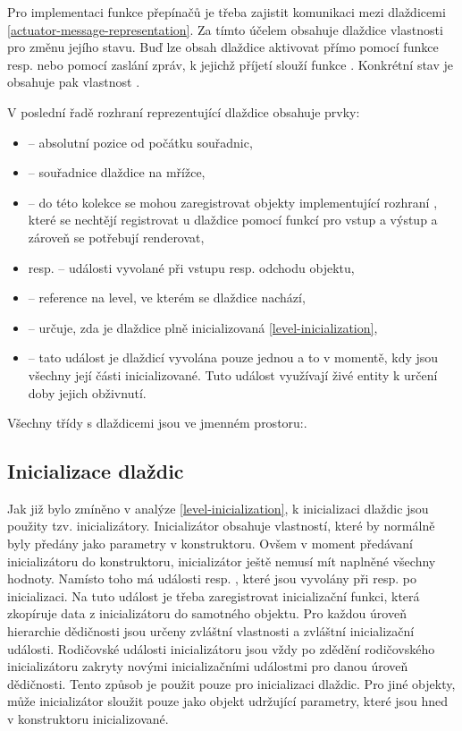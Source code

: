 
Pro implementaci funkce přepínačů je třeba zajistit komunikaci mezi dlaždicemi \vref{actuator-message-representation}.
Za tímto účelem obsahuje dlaždice vlastnosti pro změnu jejího stavu. Buď lze obsah dlaždice aktivovat přímo
pomocí funkce  resp.  nebo pomocí zaslání zpráv, k jejichž
příjetí slouží funkce . Konkrétní stav je obsahuje pak vlastnost .


V poslední řadě rozhraní reprezentující dlaždice obsahuje prvky: 
\begin{itemize}
\item {} -- absolutní pozice od počátku souřadnic,
\item {} -- souřadnice dlaždice na mřížce, 
\item {} -- do této kolekce se mohou zaregistrovat objekty implementující rozhraní , 
	které se nechtějí registrovat u dlaždice pomocí funkcí pro vstup a výstup a zároveň se potřebují renderovat, 
\item {} resp.  -- události vyvolané při vstupu resp. odchodu objektu,
\item {} -- reference na level, ve kterém se dlaždice nachází,
\item {} -- určuje, zda je dlaždice plně inicializovaná \vref{level-inicialization},
\item {} -- tato událost je dlaždicí vyvolána pouze jednou a to v momentě, kdy jsou všechny její části inicializované.
		Tuto událost využívají živé entity k určení doby jejich obživnutí.
\end{itemize}

Všechny třídy s dlaždicemi jsou ve jmenném prostoru:\newline {}.

\subsection{Inicializace dlaždic}
Jak již bylo zmíněno v analýze \vref{level-inicialization}, k inicializaci dlaždic jsou použity tzv. inicializátory. Inicializátor
obsahuje vlastností, které by normálně byly předány jako parametry v konstruktoru. Ovšem v moment předávaní
inicializátoru do konstruktoru, inicializátor ještě nemusí mít naplněné všechny hodnoty. Namísto toho má události 
resp. , které jsou vyvolány při resp. po inicializaci. Na tuto událost je třeba zaregistrovat
inicializační funkci, která zkopíruje data z inicializátoru do samotného objektu. Pro každou úroveň hierarchie
dědičnosti jsou určeny zvláštní vlastnosti a zvláštní inicializační události. Rodičovské události  inicializátoru jsou vždy
po zdědění rodičovského inicializátoru zakryty novými inicializačními událostmi pro danou úroveň dědičnosti.
Tento způsob je použit pouze pro inicializaci dlaždic. Pro jiné objekty, může inicializátor sloužit pouze jako 
objekt udržující parametry, které jsou hned v konstruktoru inicializované. 

